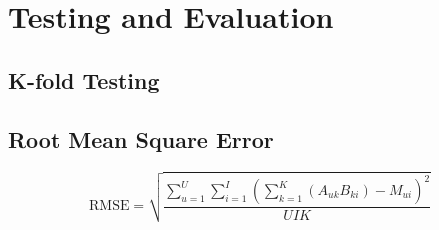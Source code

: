 \section{Testing and Evaluation}
\subsection{K-fold Testing}
\subsection{Root Mean Square Error}
\begin{equation}\label{eq:rmse}
	\text{RMSE} = \sqrt{\frac{\sum_{u=1}^{U}\sum_{i=1}^{I}(\sum_{k=1}^{K}(A_{uk} B_{ki}) - M_{ui})^2}{UIK}}
\end{equation}
